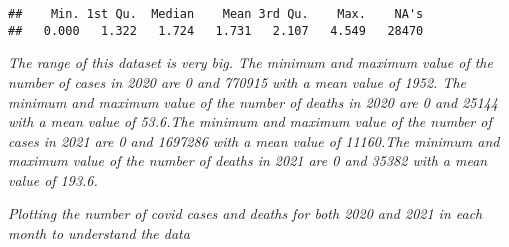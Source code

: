 \documentclass[
]{article}
\newenvironment{Shaded}{\begin{snugshade}}{\end{snugshade}}
\newcommand{\CommentTok}[1]{\textcolor[rgb]{0.56,0.35,0.01}{\textit{#1}}}
\newcommand{\ConstantTok}[1]{\textcolor[rgb]{0.56,0.35,0.01}{#1}}
\newcommand{\FunctionTok}[1]{\textcolor[rgb]{0.13,0.29,0.53}{\textbf{#1}}}
\newcommand{\NormalTok}[1]{#1}
\newcommand{\OtherTok}[1]{\textcolor[rgb]{0.56,0.35,0.01}{#1}}
\newcommand{\SpecialCharTok}[1]{\textcolor[rgb]{0.81,0.36,0.00}{\textbf{#1}}}
\newcommand{\StringTok}[1]{\textcolor[rgb]{0.31,0.60,0.02}{#1}}
\begin{document}
\begin{Shaded}
\end{Shaded}

\begin{verbatim}
##    Min. 1st Qu.  Median    Mean 3rd Qu.    Max.    NA's 
##   0.000   1.322   1.724   1.731   2.107   4.549   28470
\end{verbatim}

\emph{The range of this dataset is very big. The minimum and maximum
value of the number of cases in 2020 are 0 and 770915 with a mean value
of 1952. The minimum and maximum value of the number of deaths in 2020
are 0 and 25144 with a mean value of 53.6.The minimum and maximum value
of the number of cases in 2021 are 0 and 1697286 with a mean value of
11160.The minimum and maximum value of the number of deaths in 2021 are
0 and 35382 with a mean value of 193.6.}

\emph{Plotting the number of covid cases and deaths for both 2020 and
2021 in each month to understand the data}

\begin{Shaded}
\end{Shaded}
\end{document}
